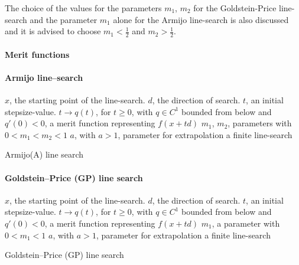 The choice of the values for the parameters $m_1$, $m_2$ for the
Goldstein-Price line-search and the parameter $m_1$ alone for the Armijo line-search is also discussed and it is advised to choose
$m_1 < \frac{1}{2}$ and $m_2 > \frac{1}{2}$.
\paragraph{Merit functions}

\paragraph{Armijo line--search}

\begin{algorithm}
  \begin{algorithmic}
    {\sf
      \REQUIRE $x$, the starting point of the line-search.
      \REQUIRE $d$, the direction of search.
      \REQUIRE $t$, an initial stepsize-value.
      \REQUIRE $t \to q(t)$, for $t \geq 0$, with $q \in C^1$ bounded from below and $q'(0) < 0$, a merit function representing $f(x + t d)$
      \REQUIRE $m_1$, $m_2$, parameters with $0 < m_1 < m_2 < 1$
      \REQUIRE $a$, with $a > 1$, parameter for extrapolation
      \ENSURE a finite line-search

      \ENDIF
      \ENDIF

      \ELSE
      \ENDIF
      \ENDWHILE
    }
  \end{algorithmic}
  \caption{Armijo(A) line search}  \label{Algo:A}
\end{algorithm}

\paragraph{Goldstein--Price (GP) line search}
\begin{algorithm}
  \begin{algorithmic}
    {\sf
      \REQUIRE $x$, the starting point of the line-search.
      \REQUIRE $d$, the direction of search.
      \REQUIRE $t$, an initial stepsize-value.
      \REQUIRE $t \to q(t)$, for $t \geq 0$, with $q \in C^1$ bounded from below and $q'(0) < 0$, a merit function representing $f(x + t d)$
      \REQUIRE $m_1$, a parameter with $0 < m_1 < 1$
      \REQUIRE $a$, with $a > 1$, parameter for extrapolation
      \ENSURE a finite line-search
      \ELSE
      \ENDIF
      \ENDWHILE
      
    }
  \end{algorithmic}
  \caption{Goldstein--Price (GP) line search}  \label{Algo:GP}
\end{algorithm}


